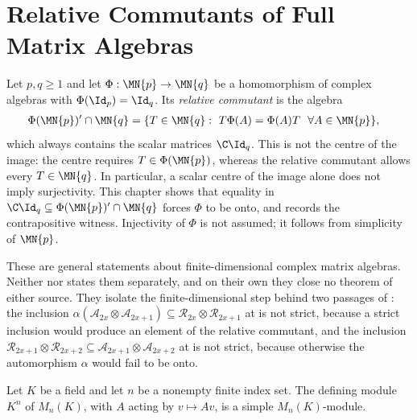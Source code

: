 
\chapter{Relative Commutants of Full Matrix Algebras}%
\label{ch:matrix_relative_commutant}

Let $p,q\geq1$ and let $\Phi:\MN{p}\to\MN{q}$ be a homomorphism of complex
algebras with $\Phi(\Id_p)=\Id_q$.  Its \emph{relative commutant} is the
algebra
\begin{align}
    \Phi(\MN{p})^{\prime}\cap\MN{q}
     & =\{T\in\MN{q}:\
    T\Phi(A)=\Phi(A)T\ \ \forall A\in\MN{p}\},
    \label{eq:matalg_relative_commutant}
\end{align}
which always contains the scalar matrices $\C\Id_q$.  This is not the
centre of the image: the centre requires $T\in\Phi(\MN{p})$, whereas the
relative commutant allows every $T\in\MN{q}$.  In particular, a scalar
centre of the image alone does not imply surjectivity.  This chapter shows
that equality in
$\C\Id_q\subseteq\Phi(\MN{p})^{\prime}\cap\MN{q}$ forces $\Phi$ to be
onto, and records the contrapositive witness.  Injectivity of $\Phi$ is
not assumed; it follows from simplicity of $\MN{p}$.

These are general statements about finite-dimensional complex matrix
algebras.  Neither \cite{SchumacherWerner2004QCA} nor
\cite{Gross2012IndexTheory} states them separately, and on their own they
close no theorem of either source.  They isolate the finite-dimensional step
behind two passages of \cite{Gross2012IndexTheory}: the inclusion
$\alpha(\mathcal A_{2x}\otimes\mathcal A_{2x+1})\subseteq
    \mathcal R_{2x}\otimes\mathcal R_{2x+1}$
at \cite[lines~1276--1287]{Gross2012IndexTheory} is not strict, because a
strict inclusion would produce an element of the relative commutant, and the
inclusion
$\mathcal R_{2x+1}\otimes\mathcal R_{2x+2}\subseteq
    \mathcal A_{2x+1}\otimes\mathcal A_{2x+2}$
at \cite[lines~1306--1315]{Gross2012IndexTheory} is not strict, because
otherwise the automorphism $\alpha$ would fail to be onto.

\begin{lemma}
    \label{lem:matalg_defining_module_simple}
    \leanok
    Let $K$ be a field and let $n$ be a nonempty finite index set.  The
    defining module $K^n$ of $M_n(K)$, with $A$ acting by $v\mapsto Av$, is
    a simple $M_n(K)$-module.
\end{lemma}

